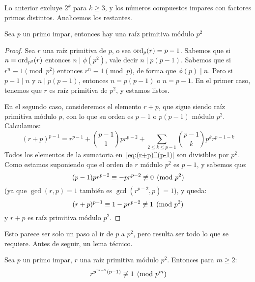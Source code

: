   Lo anterior excluye \(2^k\) para \(k \ge 3\),
  y los números compuestos impares con factores primos distintos.
  Analicemos los restantes.
  \begin{theorem}
    \label{theo:raiz-primitiva-p2}
    Sea \(p\) un primo impar,
    entonces hay una raíz primitiva módulo \(p^2\)
  \end{theorem}
  \begin{proof}
    Sea \(r\) una raíz primitiva de \(p\),
    o sea \(\operatorname{ord}_p (r) = p - 1\).
    Sabemos que si \(n = \operatorname{ord}_{p^2}(r)\)
    entonces \(n \mid \phi(p^2)\),
    vale decir \(n \mid p (p - 1)\).
    Sabemos que si \(r^n \equiv 1 \pmod{p^2}\)
    entonces \(r^n \equiv 1 \pmod{p}\),
    de forma que \(\phi(p) \mid n\).
    Pero si \(p - 1 \mid n\) y \(n \mid p (p - 1)\),
    entonces \(n = p (p - 1)\) o \(n = p - 1\).
    En el primer caso,
    tenemos que \(r\) es raíz primitiva de \(p^2\),
    y estamos listos.

    En el segundo caso,
    consideremos el elemento \(r + p\),
    que sigue siendo raíz primitiva módulo \(p\),
    con lo que su orden es \(p - 1\) o \(p (p - 1)\) módulo \(p^2\).
    Calculamos:
    \begin{equation}
      \label{eq:(r+p)^(p-1)}
      (r + p)^{p - 1}
	= r^{p - 1}
	   + \binom{p - 1}{1} p r^{p - 2}
	   + \sum_{2 \le k \le p - 1}
	       \binom{p - 1}{k} p^k r^{p - 1 - k}
    \end{equation}
    Todos los elementos de la sumatoria en~\eqref{eq:(r+p)^(p-1)}
    son divisibles por \(p^2\).
    Como estamos suponiendo
    que el orden de \(r\) módulo \(p^2\) es \(p - 1\),
    y sabemos que:
    \begin{equation*}
      (p - 1) p r^{p - 2}
	\equiv - p r^{p - 2}
	\centernot\equiv 0 \pmod{p^2}
    \end{equation*}
    (ya que \(\gcd(r, p) = 1\)
     también es \(\gcd(r^{p - 2}, p) = 1\)),
    y queda:
    \begin{equation*}
      (r + p)^{p - 1}
	\equiv 1 - p r^{p - 2}
	\centernot\equiv 1 \pmod{p^2} \\
    \end{equation*}
    y \(r + p\) es raíz primitiva módulo \(p^2\).
  \end{proof}
  Esto parece ser solo un paso al ir de \(p\) a \(p^2\),
  pero resulta ser todo lo que se requiere.
  Antes de seguir,
  un lema técnico.
  \begin{lemma}
    \label{lem:raiz-primitiva-p2-orden-pk}
    Sea \(p\) un primo impar,
    \(r\) una raíz primitiva módulo \(p^2\).
    Entonces para \(m \ge 2\):
    \begin{equation}
      \label{eq:r^(p^(m-2)(p-1))<>1}
      r^{p^{m - 2} (p - 1)}
	\centernot\equiv 1 \pmod{p^m}
    \end{equation}
  \end{lemma}

